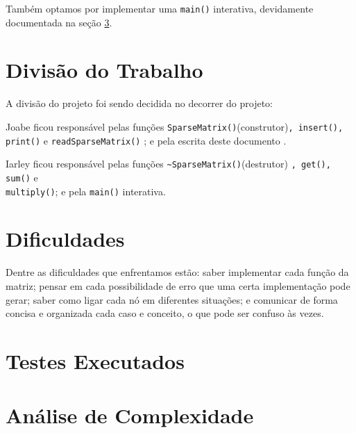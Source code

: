 \documentclass[12pt, letterpaper]{article}
\begin{document}
		Também optamos por implementar uma \verb|main()| interativa, devidamente documentada na seção \ref{tests}.
	\section{Divisão do Trabalho} \label{div}
		A divisão do projeto foi sendo decidida no decorrer do projeto:
		
		Joabe ficou responsável pelas funções \verb|SparseMatrix()|(construtor)\verb|, insert(), print()| e \verb|readSparseMatrix()| \cite{ArquivosCFB2017, CppFilesShmeowlex2021}; e pela escrita deste documento \cite{LearnOverleaf2022}.

		Iarley ficou responsável pelas funções \verb|~SparseMatrix()|(destrutor) \verb|, get(), sum()| e \\ \verb|multiply()|; e pela \verb|main()| interativa.
	\section{Dificuldades} \label{difc}
		Dentre as dificuldades que enfrentamos estão: saber implementar cada função da matriz; pensar em cada possibilidade de erro que uma certa implementação pode gerar; saber como ligar cada nó em diferentes situações; e comunicar de forma concisa e organizada cada caso e conceito, o que pode ser confuso às vezes.
	\section{Testes Executados} \label{tests}
	\section{Análise de Complexidade} \label{complx}

	\pagebreak
	\printbibliography
\end{document}
